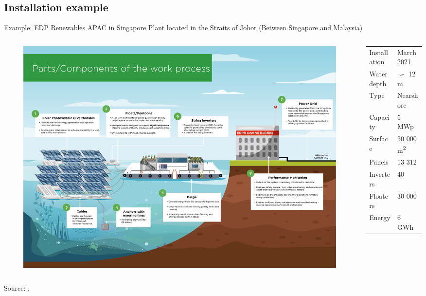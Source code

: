 \documentclass[aspectratio=169, 12pt]{beamer}
\begin{document}
\subsection{Installation example}
\begin{frame}{Example: EDP Renewables APAC in Singapore}
  Plant located in the Straits of Johor (Between Singapore and Malaysia)
  \begin{columns}
    \begin{column}{0.62\columnwidth}
      \begin{figure}
        \centering
        \includegraphics[width=\columnwidth]{figure/floating_edpr.jpg}
      \end{figure}
    \end{column}
    \begin{column}{0.38\columnwidth}
      \begin{table}
        \begin{tabular}{ll}
          Installation & March 2021\\
          Water depth & $\backsim $ 12 m\\
          Type & Nearshore \\
          Capacity & 5 MWp\\
          Surface & 50 000 \si{\square\meter}\\
          Panels & 13 312 \\
          Inverters & 40 \\
          Floaters & 30 000\\
          Energy & 6 GWh\\
        \end{tabular}
      \end{table}
    \end{column}
  \end{columns}
  {\tiny Source: \cite{edpr_floating_solar}, \cite{straitstimes_floating_solar_farm}}
\end{frame}
\end{document}
